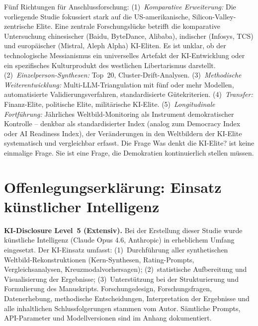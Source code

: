 \documentclass[12pt,a4paper]{article}
\begin{document}
F\"unf Richtungen f\"ur Anschlussforschung: (1)~\emph{Komparative Erweiterung:} Die vorliegende Studie fokussiert stark auf die US-amerikanische, Silicon-Valley-zentrische Elite. Eine zentrale Forschungsl\"ucke betrifft die komparative Untersuchung chinesischer (Baidu, ByteDance, Alibaba), indischer (Infosys, TCS) und europ\"aischer (Mistral, Aleph Alpha) KI-Eliten. Es ist unklar, ob der \glqq technologische Messianismus\grqq{} ein universelles Artefakt der KI-Entwicklung oder ein spezifisches Kulturprodukt des westlichen Libertarismus darstellt. (2)~\emph{Einzelperson-Synthesen:} Top~20, Cluster-Drift-Analysen. (3)~\emph{Methodische Weiterentwicklung:} Multi-LLM-Triangulation mit f\"unf oder mehr Modellen, automatisierte Validierungsverfahren, standardisierte G\"utekriterien. (4)~\emph{Transfer:} Finanz-Elite, politische Elite, milit\"arische KI-Elite. (5)~\emph{Longitudinale Fortf\"uhrung:} J\"ahrliches Weltbild-Monitoring als Instrument demokratischer Kontrolle -- denkbar als standardisierter Index (analog zum Democracy Index oder AI Readiness Index), der Ver\"anderungen in den Weltbildern der KI-Elite systematisch und vergleichbar erfasst. Die Frage \glqq Was denkt die KI-Elite?\grqq{} ist keine einmalige Frage. Sie ist eine Frage, die Demokratien kontinuierlich stellen m\"ussen.


\section*{Offenlegungserkl\"arung: Einsatz k\"unstlicher Intelligenz}

\noindent\textbf{KI-Disclosure Level~5 (Extensiv).}
Bei der Erstellung dieser Studie wurde k\"unstliche Intelligenz (Claude Opus 4.6, Anthropic) in erheblichem Umfang eingesetzt. Der KI-Einsatz umfasst: (1)~Durchf\"uhrung aller synthetischen Weltbild-Rekonstruktionen (Kern-Synthesen, Rating-Prompts, Vergleichsanalysen, Kreuzmodalvorhersagen); (2)~statistische Aufbereitung und Visualisierung der Ergebnisse; (3)~Unterst\"utzung bei der Strukturierung und Formulierung des Manuskripts. Forschungsdesign, Forschungsfragen, Datenerhebung, methodische Entscheidungen, Interpretation der Ergebnisse und alle inhaltlichen Schlussfolgerungen stammen vom Autor. S\"amtliche Prompts, API-Parameter und Modellversionen sind im Anhang dokumentiert.


\end{document}
